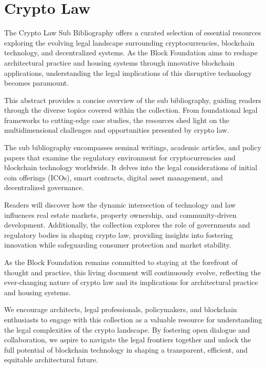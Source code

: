 \section{Crypto Law}



The Crypto Law Sub Bibliography offers a curated selection of essential resources exploring the evolving legal landscape surrounding cryptocurrencies, blockchain technology, and decentralized systems. As the Block Foundation aims to reshape architectural practice and housing systems through innovative blockchain applications, understanding the legal implications of this disruptive technology becomes paramount.

This abstract provides a concise overview of the sub bibliography, guiding readers through the diverse topics covered within the collection. From foundational legal frameworks to cutting-edge case studies, the resources shed light on the multidimensional challenges and opportunities presented by crypto law.

The sub bibliography encompasses seminal writings, academic articles, and policy papers that examine the regulatory environment for cryptocurrencies and blockchain technology worldwide. It delves into the legal considerations of initial coin offerings (ICOs), smart contracts, digital asset management, and decentralized governance.

Readers will discover how the dynamic intersection of technology and law influences real estate markets, property ownership, and community-driven development. Additionally, the collection explores the role of governments and regulatory bodies in shaping crypto law, providing insights into fostering innovation while safeguarding consumer protection and market stability.

As the Block Foundation remains committed to staying at the forefront of thought and practice, this living document will continuously evolve, reflecting the ever-changing nature of crypto law and its implications for architectural practice and housing systems.

We encourage architects, legal professionals, policymakers, and blockchain enthusiasts to engage with this collection as a valuable resource for understanding the legal complexities of the crypto landscape. By fostering open dialogue and collaboration, we aspire to navigate the legal frontiers together and unlock the full potential of blockchain technology in shaping a transparent, efficient, and equitable architectural future.




